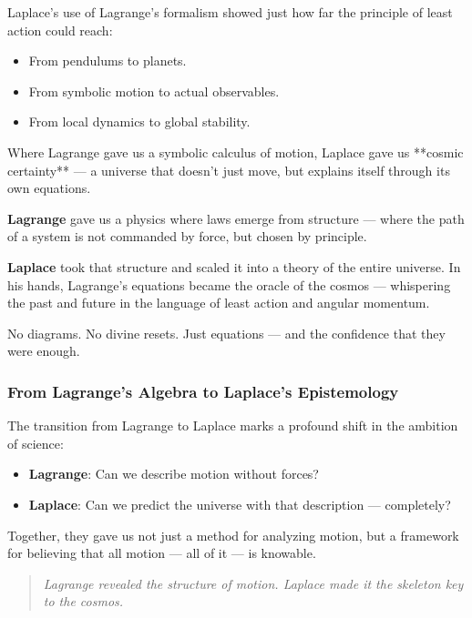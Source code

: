 Laplace's use of Lagrange’s formalism showed just how far the principle of least action could reach:
\begin{itemize}
    \item From pendulums to planets.
    \item From symbolic motion to actual observables.
    \item From local dynamics to global stability.
\end{itemize}

Where Lagrange gave us a symbolic calculus of motion, Laplace gave us **cosmic certainty** — a universe that doesn’t just move, but explains itself through its own equations.

\vspace{1em}
\begin{tcolorbox}[colback=blue!5!white, colframe=blue!60!black, title={Laplace’s Determinism in a Lagrangian World}]
\textbf{Lagrange} gave us a physics where laws emerge from structure — where the path of a system is not commanded by force, but chosen by principle.

\textbf{Laplace} took that structure and scaled it into a theory of the entire universe. In his hands, Lagrange’s equations became the oracle of the cosmos — whispering the past and future in the language of least action and angular momentum.

No diagrams. No divine resets. Just equations — and the confidence that they were enough.
\end{tcolorbox}

\subsubsection*{From Lagrange’s Algebra to Laplace’s Epistemology}

The transition from Lagrange to Laplace marks a profound shift in the ambition of science:
\begin{itemize}
    \item \textbf{Lagrange}: Can we describe motion without forces?
    \item \textbf{Laplace}: Can we predict the universe with that description — completely?
\end{itemize}

Together, they gave us not just a method for analyzing motion, but a framework for believing that all motion — all of it — is knowable.

\begin{quote}
\textit{Lagrange revealed the structure of motion.  
Laplace made it the skeleton key to the cosmos.}
\end{quote}



